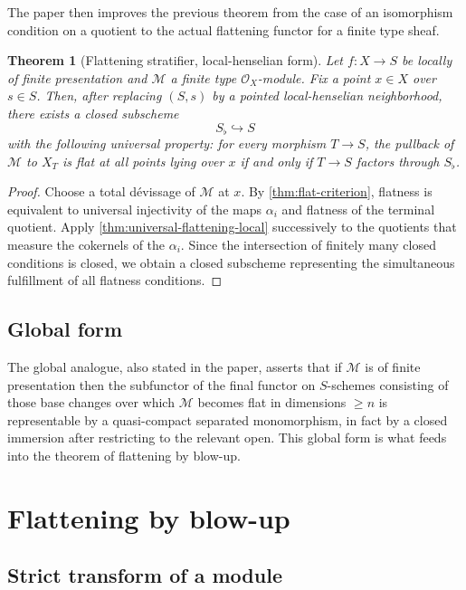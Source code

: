 \documentclass[11pt,oneside]{article}
\newtheorem{theorem}{Theorem}[section]
\newcommand{\M}{\mathcal M}
\newcommand{\OO}{\mathcal O}
\begin{document}
The paper then improves the previous theorem from the case of an isomorphism condition on a quotient to the actual flattening functor for a finite type sheaf.

\begin{theorem}[Flattening stratifier, local-henselian form]\label{thm:flattening-stratifier-local}
Let $f\colon X\to S$ be locally of finite presentation and $\M$ a finite type $\OO_X$-module.  Fix a point $x\in X$ over $s\in S$.  Then, after replacing $(S,s)$ by a pointed local-henselian neighborhood, there exists a closed subscheme
\[
S_\flat\hookrightarrow S
\]
with the following universal property: for every morphism $T\to S$, the pullback of $\M$ to $X_T$ is flat at all points lying over $x$ if and only if $T\to S$ factors through $S_\flat$.
\end{theorem}

\begin{proof}
Choose a total d\'evissage of $\M$ at $x$.  By \cref{thm:flat-criterion}, flatness is equivalent to universal injectivity of the maps $\alpha_i$ and flatness of the terminal quotient.  Apply \cref{thm:universal-flattening-local} successively to the quotients that measure the cokernels of the $\alpha_i$.  Since the intersection of finitely many closed conditions is closed, we obtain a closed subscheme representing the simultaneous fulfillment of all flatness conditions.
\end{proof}

\subsection{Global form}

The global analogue, also stated in the paper, asserts that if $\M$ is of finite presentation then the subfunctor of the final functor on $S$-schemes consisting of those base changes over which $\M$ becomes flat in dimensions $\ge n$ is representable by a quasi-compact separated monomorphism, in fact by a closed immersion after restricting to the relevant open.  This global form is what feeds into the theorem of flattening by blow-up.

\section{Flattening by blow-up}

\subsection{Strict transform of a module}
\end{document}
